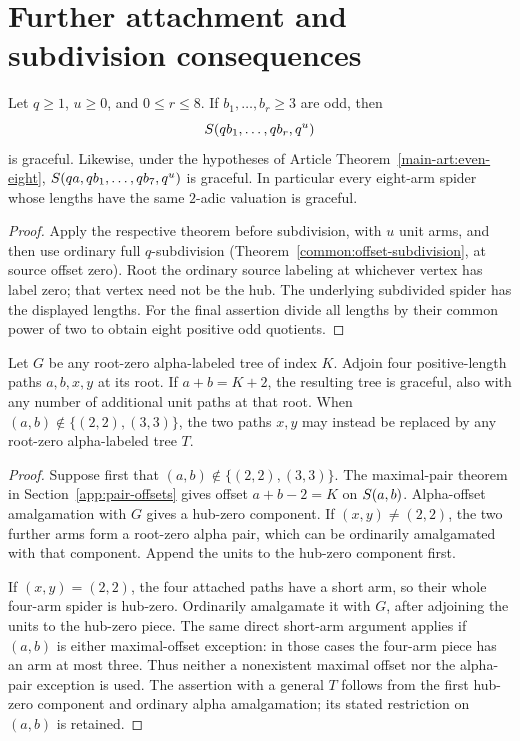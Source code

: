 \section{Further attachment and subdivision consequences}\label{eight:extensions}

\begin{corollary}\label{eight:common-short}
Let $q\ge1$, $u\ge0$, and $0\le r\le8$.  If $b_1,\ldots,b_r\ge3$
are odd, then
\[
 S\!\left(qb_1,\ldots,qb_r,q^u\right)
\]
is graceful.  Likewise, under the hypotheses of
Article Theorem~\ref*{main-art:even-eight},
$S\!\left(qa,qb_1,\ldots,qb_7,q^u\right)$ is graceful.
In particular every eight-arm spider whose lengths have the same
$2$-adic valuation is graceful.
\end{corollary}
\begin{proof}
Apply the respective theorem before subdivision, with $u$ unit arms,
and then use ordinary full $q$-subdivision
(Theorem~\ref{common:offset-subdivision}, at source offset zero).
Root the ordinary source labeling at whichever vertex has label zero;
that vertex need not be the hub.  The underlying subdivided spider has
the displayed lengths.  For the final assertion divide all lengths by
their common power of two to obtain eight positive odd quotients.
\end{proof}

\begin{proposition}\label{eight:four-paths}
Let $G$ be any root-zero alpha-labeled tree of index $K$.  Adjoin four
positive-length paths $a,b,x,y$ at its root.  If $a+b=K+2$, the
resulting tree is graceful, also with any number of additional unit
paths at that root.  When $(a,b)\notin\{(2,2),(3,3)\}$, the two
paths $x,y$ may instead be replaced by any root-zero alpha-labeled
tree $T$.
\end{proposition}
\begin{proof}
Suppose first that $(a,b)\notin\{(2,2),(3,3)\}$.  The maximal-pair
theorem in Section~\ref{app:pair-offsets} gives offset $a+b-2=K$ on
$S\!\left(a,b\right)$.  Alpha-offset amalgamation with $G$ gives a hub-zero
component.  If $(x,y)\ne(2,2)$, the two further arms form a root-zero
alpha pair, which can be ordinarily amalgamated with that component.
Append the units to the hub-zero component first.

If $(x,y)=(2,2)$, the four attached paths have a short arm, so their
whole four-arm spider is hub-zero.  Ordinarily amalgamate it with $G$,
after adjoining the units to the hub-zero piece.  The same direct
short-arm argument applies if $(a,b)$ is either maximal-offset
exception: in those cases the four-arm piece has an arm at most three.
Thus neither a nonexistent maximal offset nor the alpha-pair exception
is used.  The assertion with a general $T$ follows from the first
hub-zero component and ordinary alpha amalgamation; its stated
restriction on $(a,b)$ is retained.
\end{proof}

